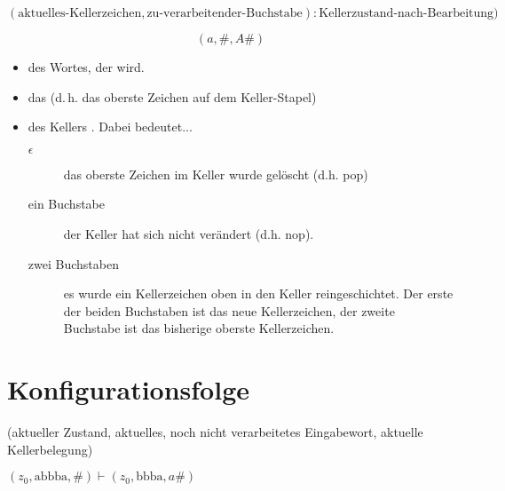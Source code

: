 \documentclass{lehramt-informatik-haupt}
\begin{document}
\begin{displaymath}
(
\text{aktuelles-Kellerzeichen},
\text{zu-verarbeitender-Buchstabe}):
\text{Kellerzustand-nach-Bearbeitung})
\end{displaymath}

\begin{displaymath}
(a, \#, A\#)
\end{displaymath}

\begin{itemize}
\item

 des Wortes, der  wird.

\item

das  (d.\,h. das oberste
Zeichen auf dem Keller-Stapel)

\item

 des Kellers . Dabei bedeutet...

\begin{description}
\item[$\epsilon$]

das oberste Zeichen im Keller wurde gelöscht (d.h. pop)

\item[ein Buchstabe]

der Keller hat sich nicht verändert (d.h. nop).

\item[zwei Buchstaben]

es wurde ein Kellerzeichen oben in den Keller reingeschichtet. Der erste
der beiden Buchstaben ist das neue Kellerzeichen, der zweite Buchstabe
ist das bisherige oberste Kellerzeichen.
\end{description}
\end{itemize}

%

\section{Konfigurationsfolge}

\begin{center}
(aktueller Zustand, aktuelles, noch nicht verarbeitetes Eingabewort, aktuelle Kellerbelegung)
\end{center}

\begin{center}
$(z_0, \text{abbba}, \# ) \vdash (z_0, \text{bbba}, a\#)$
\end{center}

\literatur
\end{document}
